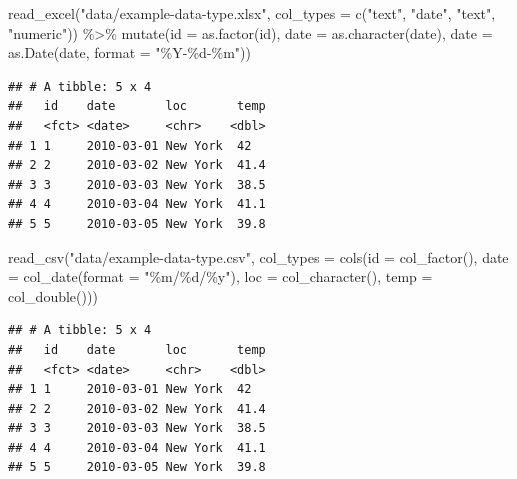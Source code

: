 \documentclass[
]{book}
\newenvironment{Shaded}{\begin{snugshade}}{\end{snugshade}}
\newcommand{\AttributeTok}[1]{\textcolor[rgb]{0.77,0.63,0.00}{#1}}
\newcommand{\FunctionTok}[1]{\textcolor[rgb]{0.00,0.00,0.00}{#1}}
\newcommand{\NormalTok}[1]{#1}
\newcommand{\SpecialCharTok}[1]{\textcolor[rgb]{0.00,0.00,0.00}{#1}}
\newcommand{\StringTok}[1]{\textcolor[rgb]{0.31,0.60,0.02}{#1}}
\begin{document}
\begin{Shaded}
\begin{Highlighting}[]
\FunctionTok{read\_excel}\NormalTok{(}\StringTok{"data/example{-}data{-}type.xlsx"}\NormalTok{, }
                   \AttributeTok{col\_types =} \FunctionTok{c}\NormalTok{(}\StringTok{"text"}\NormalTok{, }\StringTok{"date"}\NormalTok{, }\StringTok{"text"}\NormalTok{, }\StringTok{"numeric"}\NormalTok{)) }\SpecialCharTok{\%\textgreater{}\%}
  \FunctionTok{mutate}\NormalTok{(}\AttributeTok{id =} \FunctionTok{as.factor}\NormalTok{(id),}
         \AttributeTok{date =} \FunctionTok{as.character}\NormalTok{(date),}
         \AttributeTok{date =} \FunctionTok{as.Date}\NormalTok{(date, }\AttributeTok{format =} \StringTok{"\%Y{-}\%d{-}\%m"}\NormalTok{))}
\end{Highlighting}
\end{Shaded}

\begin{verbatim}
## # A tibble: 5 x 4
##   id    date       loc       temp
##   <fct> <date>     <chr>    <dbl>
## 1 1     2010-03-01 New York  42  
## 2 2     2010-03-02 New York  41.4
## 3 3     2010-03-03 New York  38.5
## 4 4     2010-03-04 New York  41.1
## 5 5     2010-03-05 New York  39.8
\end{verbatim}

\begin{Shaded}
\begin{Highlighting}[]
\FunctionTok{read\_csv}\NormalTok{(}\StringTok{"data/example{-}data{-}type.csv"}\NormalTok{,}
         \AttributeTok{col\_types =} \FunctionTok{cols}\NormalTok{(}\AttributeTok{id =} \FunctionTok{col\_factor}\NormalTok{(),}
                          \AttributeTok{date =} \FunctionTok{col\_date}\NormalTok{(}\AttributeTok{format =} \StringTok{"\%m/\%d/\%y"}\NormalTok{),}
                          \AttributeTok{loc =} \FunctionTok{col\_character}\NormalTok{(),}
                          \AttributeTok{temp =} \FunctionTok{col\_double}\NormalTok{()))}
\end{Highlighting}
\end{Shaded}

\begin{verbatim}
## # A tibble: 5 x 4
##   id    date       loc       temp
##   <fct> <date>     <chr>    <dbl>
## 1 1     2010-03-01 New York  42  
## 2 2     2010-03-02 New York  41.4
## 3 3     2010-03-03 New York  38.5
## 4 4     2010-03-04 New York  41.1
## 5 5     2010-03-05 New York  39.8
\end{verbatim}
\end{document}
